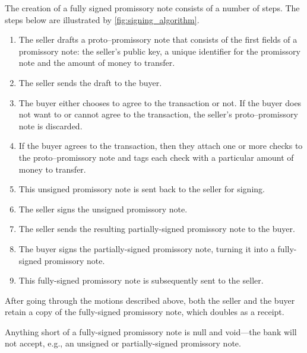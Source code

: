 \documentclass[12pt,a4paper]{article}
\begin{document}
\begin{multicols}{2}
	The creation of a fully signed promissory note consists of a number of steps. The steps below are illustrated by \autoref{fig:signing_algorithm}.
	
	\begin{enumerate}
		\item The seller drafts a proto--promissory note that consists of the first fields of a promissory note: the seller's public key, a unique identifier for the promissory note and the amount of money to transfer.
		
		\item The seller sends the draft to the buyer.
		
		\item The buyer either chooses to agree to the transaction or not. If the buyer does not want to or cannot agree to the transaction, the seller's proto--promissory note is discarded.
		
		\item If the buyer agrees to the transaction, then they attach one or more checks to the proto--promissory note and tags each check with a particular amount of money to transfer. 
		
		\item This unsigned promissory note is sent back to the seller for signing.
		
		\item The seller signs the unsigned promissory note.
		
		\item The seller sends the resulting partially-signed promissory note to the buyer.
		
		\item The buyer signs the partially-signed promissory note, turning it into a fully-signed promissory note.
		
		\item This fully-signed promissory note is subsequently sent to the seller.
	\end{enumerate}

	After going through the motions described above, both the seller and the buyer retain a copy of the fully-signed promissory note, which doubles as a receipt.
	
	Anything short of a fully-signed promissory note is null and void---the bank will not accept, e.g., an unsigned or partially-signed promissory note.
	
	\end{multicols}
	\newpage
    
\end{document}
